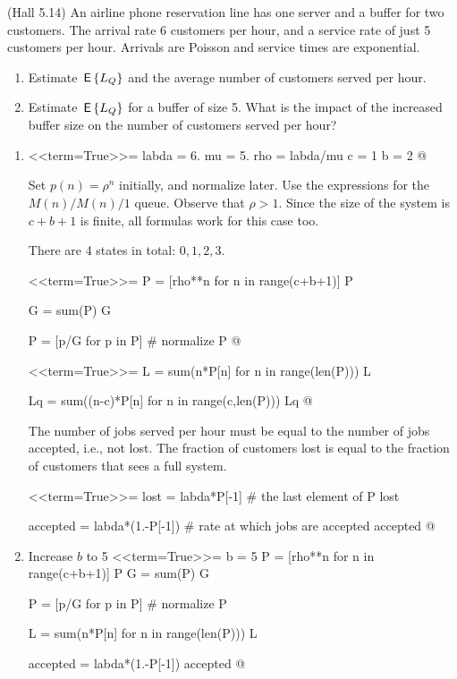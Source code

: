 \begin{question}
  (Hall 5.14) An airline phone reservation line has one server and a
  buffer for two customers. The arrival rate 6 customers per hour, and
  a service rate of just 5 customers per hour. Arrivals are Poisson and service times are exponential. 
  \begin{enumerate}
  \item Estimate $\,\mathsf{E}\left\{L_Q\right\}$ and the average number of customers served per hour.
  \item Estimate $\,\mathsf{E}\left\{L_Q\right\}$ for a buffer of size 5. What is the impact of the increased buffer size on the number of customers served per hour?
  \end{enumerate}
  
    \begin{solution}
      \begin{enumerate}

      \item 

<<term=True>>=
labda = 6.
mu = 5.
rho = labda/mu
c = 1
b = 2
@ 

Set $p(n) = \rho^n$ initially, and normalize later. Use the
expressions for the $M(n)/M(n)/1$ queue.  Observe that $\rho>1$. Since
the size of the system is $c+b+1$ is finite, all formulas work for
this case too.


There are 4 states in total: $0,1,2,3$.

<<term=True>>=
P = [rho**n for n in range(c+b+1)]
P

G = sum(P)
G

P = [p/G for p in P] # normalize
P
@ 

<<term=True>>=
L = sum(n*P[n] for n in range(len(P)))
L

Lq = sum((n-c)*P[n] for n in range(c,len(P)))
Lq
@ 


The number of jobs served per hour must be equal to the number of jobs
accepted, i.e., not lost. The fraction of customers lost is equal to
the fraction of customers that sees a full system.

<<term=True>>=
lost = labda*P[-1] # the last element of P
lost

accepted = labda*(1.-P[-1]) # rate at which jobs are accepted
accepted
@  

\item 

 Increase $b$ to 5
<<term=True>>=
b = 5
P = [rho**n for n in range(c+b+1)]
P
G = sum(P)
G

P = [p/G for p in P] # normalize
P

L = sum(n*P[n] for n in range(len(P)))
L

accepted = labda*(1.-P[-1])
accepted
@      
  \end{enumerate}
    \end{solution}
\end{question}

